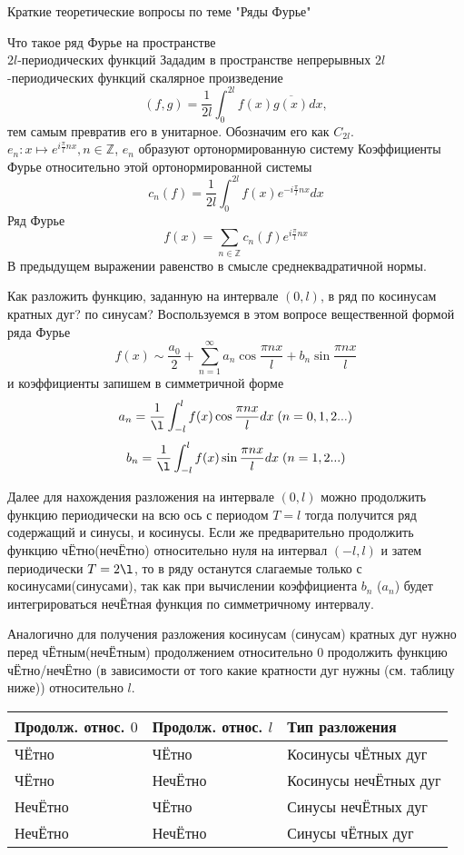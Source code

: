 \documentclass{article}
\begin{document}
\begin{section}{Краткие теоретические вопросы по теме "Ряды Фурье"}
\begin{subsection}{Что такое ряд Фурье на пространстве\\$2l$-периодических функций}
Зададим в пространстве непрерывных $2l$-периодических функций скалярное произведение
\[(f, g) = \frac{1}{2l}\int_0^{2l}f(x)\overline{g(x)}dx,\]
тем самым превратив его в унитарное. Обозначим его как $C_{2l}$.\\

$e_n: x \mapsto e^{i\frac{\pi}{l}nx}, n \in \mathbb{Z}$, $e_n$ образуют ортонормированную систему
Коэффициенты Фурье относительно этой ортонормированной системы
\[c_n(f) = \frac{1}{2l} \int_0^{2l}f(x)e^{-i\frac{\pi}{l}nx}dx\]
Ряд Фурье 
\[f(x) = \sum_{n \in \mathbb{Z}} c_n(f)e^{i\frac{\pi}{l}nx}\]
В предыдущем выражении равенство в смысле среднеквадратичной нормы.
\end{subsection}


\begin{subsection}{Как разложить функцию, заданную на интервале $(0, l)$, в ряд по косинусам кратных дуг? по синусам?}
Воспользуемся в этом вопросе вещественной формой ряда Фурье
\[f(x) \sim \frac{a_0}{2}+\sum_{n=1}^{\infty}a_n \cos \frac{\pi nx}{l} +b_n \sin \frac{\pi nx}{l}\]
и коэффициенты запишем в симметричной форме
\[a_n = \frac{1}{\l}\int_{-l}^l f(x)\cos \frac{\pi nx}{l} dx\; (n = 0, 1, 2 ...)\]
\[b_n = \frac{1}{\l}\int_{-l}^l f(x)\sin \frac{\pi nx}{l} dx\; (n = 1, 2 ...)\]

Далее для нахождения разложения на интервале $(0, l)$ можно продолжить функцию периодически на всю ось с периодом $T = l$ тогда получится ряд содержащий и синусы, и косинусы. Если же предварительно продолжить функцию чЁтно(нечЁтно) относительно нуля на интервал $ (-l, l) $ и затем периодически $T = 2\l$, то в ряду останутся слагаемые только с косинусами(синусами), так как при вычислении коэффициента $ b_n $ ($a_n$) будет интегрироваться нечЁтная функция по симметричному интервалу.

Аналогично для получения разложения косинусам (синусам) кратных дуг нужно перед чЁтным(нечЁтным) продолжением относительно 0 продолжить функцию чЁтно/нечЁтно (в зависимости от того какие кратности дуг нужны (см. таблицу ниже)) относительно $l$.

\begin{table}[h]
	\begin{tabular}{|l|l|l|}
		\hline
		Продолж. относ. $0$     & Продолж. относ. $l$ 	& Тип разложения        \\ \hline
		ЧЁтно                        & ЧЁтно                        & Косинусы чЁтных дуг   \\ \hline
		ЧЁтно                        & НечЁтно                      & Косинусы нечЁтных дуг \\ \hline
		НечЁтно                      & ЧЁтно                        & Синусы нечЁтных дуг     \\ \hline
		НечЁтно                      & НечЁтно                      & Синусы чЁтных дуг   \\ \hline
	\end{tabular}
\end{table}


\end{subsection}
\end{section}
\end{document}
